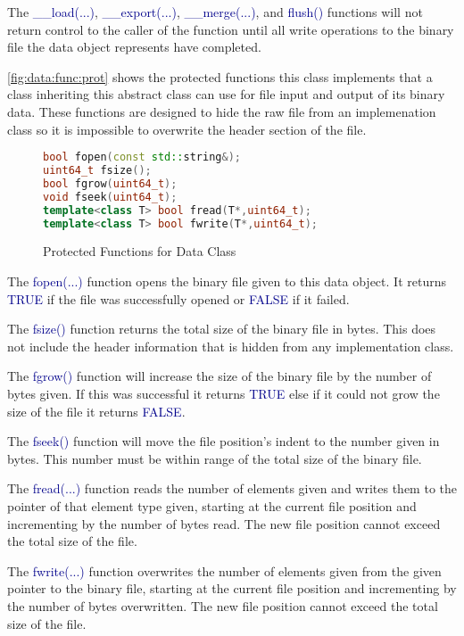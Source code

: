 \documentclass[10pt]{article}
\providecommand{\h}[1]{\textcolor{darkblue}{#1}}
\begin{document}
The \h{\_\_load(...)}, \h{\_\_export(...)}, \h{\_\_merge(...)}, and \h{flush()} 
functions will not return control to the caller of the function until all write 
operations to the binary file the data object represents have completed.

\autoref{fig:data:func:prot} shows the protected functions this class 
implements that a class inheriting this abstract class can use for file input 
and output of its binary data. These functions are designed to hide the raw 
file from an implemenation class so it is impossible to overwrite the header 
section of the file.

\begin{figure}[H]
\begin{mdframed}[style=functions]
\begin{lstlisting}[language=C++]
bool fopen(const std::string&);
uint64_t fsize();
bool fgrow(uint64_t);
void fseek(uint64_t);
template<class T> bool fread(T*,uint64_t);
template<class T> bool fwrite(T*,uint64_t);
\end{lstlisting}
\end{mdframed}
\caption{Protected Functions for Data Class}
\label{fig:data:func:prot}
\end{figure}

The \h{fopen(...)} function opens the binary file given to this data object. It 
returns \h{TRUE} if the file was successfully opened or \h{FALSE} if it failed.

The \h{fsize()} function returns the total size of the binary file in bytes. 
This does not include the header information that is hidden from any 
implementation class.

The \h{fgrow()} function will increase the size of the binary file by the 
number of bytes given. If this was successful it returns \h{TRUE} else if it 
could not grow the size of the file it returns \h{FALSE}.

The \h{fseek()} function will move the file position's indent to the number 
given in bytes. This number must be within range of the total size of the 
binary file.

The \h{fread(...)} function reads the number of elements given and writes them 
to the pointer of that element type given, starting at the current file 
position and incrementing by the number of bytes read. The new file position 
cannot exceed the total size of the file.

The \h{fwrite(...)} function overwrites the number of elements given from the 
given pointer to the binary file, starting at the current file position and 
incrementing by the number of bytes overwritten. The new file position cannot 
exceed the total size of the file.
\end{document}
